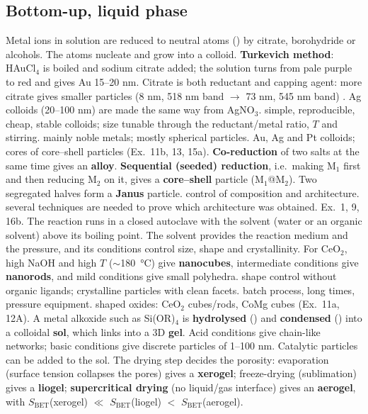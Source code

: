 \subsection{Bottom-up, liquid phase}
{Metal ions in solution are reduced to neutral atoms () by citrate, borohydride or alcohols. The atoms
nucleate and grow into a colloid. \textbf{Turkevich method}: HAuCl$_4$ is boiled and sodium citrate added; the solution turns
from pale purple to red and gives Au 15--20 nm. Citrate is both reductant and capping agent: more citrate gives smaller particles
(8 nm, 518 nm band $\to$ 73 nm, 545 nm band) . Ag colloids (20--100 nm) are made the same way from AgNO$_3$.}
{simple, reproducible, cheap, stable colloids; size tunable through the reductant/metal ratio, $T$ and stirring.}
{mainly noble metals; mostly spherical particles.}
{Au, Ag and Pt colloids; cores of core--shell particles (Ex.~11b, 13, 15a).}
{\textbf{Co-reduction} of two salts at the same time gives an \textbf{alloy}. \textbf{Sequential (seeded) reduction}, i.e.\ making
M$_1$ first and then reducing M$_2$ on it, gives a \textbf{core--shell} particle (M$_1$@M$_2$). Two segregated halves form a
\textbf{Janus} particle.}
{control of composition and architecture.}
{several techniques are needed to prove which architecture was obtained.}
{Ex.~1, 9, 16b.}
{The reaction runs in a closed autoclave with the solvent (water or an organic solvent) above its boiling point. The solvent
provides the reaction medium and the pressure, and its conditions control size, shape and crystallinity. For CeO$_2$, high NaOH and
high $T$ ($\sim$\SI{180}{\celsius}) give \textbf{nanocubes}, intermediate conditions give \textbf{nanorods}, and mild conditions
give small polyhedra.}
{shape control without organic ligands; crystalline particles with clean facets.}
{batch process, long times, pressure equipment.}
{shaped oxides: CeO$_2$ cubes/rods, CoMg cubes (Ex.~11a, 12A).}
{A metal alkoxide such as Si(OR)$_4$ is \textbf{hydrolysed} () and \textbf{condensed}
() into a colloidal \textbf{sol}, which links into a 3D \textbf{gel}. Acid conditions give
chain-like networks; basic conditions give discrete particles of 1--100 nm. Catalytic particles can be added to the sol.
The drying step decides the porosity: evaporation (surface tension collapses the pores) gives a \textbf{xerogel}; freeze-drying
(sublimation) gives a \textbf{liogel}; \textbf{supercritical drying} (no liquid/gas interface) gives an \textbf{aerogel}, with
$S_\mathrm{BET}$(xerogel) $\ll$ $S_\mathrm{BET}$(liogel) $<$ $S_\mathrm{BET}$(aerogel).}
